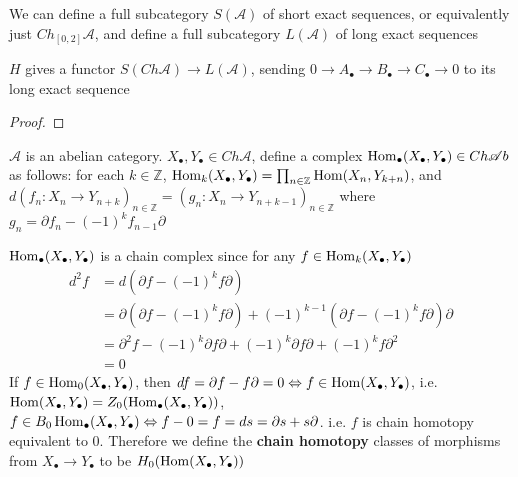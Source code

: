 \documentclass[../main.tex]{subfiles}
\begin{document}
\begin{definition}
We can define a full subcategory $S(\mathscr A)$ of short exact sequences, or equivalently just $Ch_{[0,2]}\mathscr A$, and define a full subcategory $L(\mathscr A)$ of long exact sequences
\end{definition}

\begin{lemma}
$H$ gives a functor $S(Ch\mathscr A)\to L(\mathscr A)$, sending $0\to A_\bullet\to B_\bullet\to C_\bullet\to0$ to its long exact sequence
\end{lemma}

\begin{proof}

\end{proof}

\begin{definition}
$\mathscr A$ is an abelian category. $X_\bullet,Y_\bullet\in Ch\mathscr A$, define a complex $\operatorname{Hom}_\bullet(X_\bullet,Y_\bullet)\in Ch\mathscr Ab$ as follows: for each $k\in\mathbb Z$, $\operatorname{Hom}_k(X_\bullet,Y_\bullet)=\prod_{n\in\mathbb Z}\operatorname{Hom}(X_n,Y_{k+n})$, and $d(f_n:X_n\to Y_{n+k})_{n\in\mathbb Z}=(g_n:X_n\to Y_{n+k-1})_{n\in\mathbb Z}$ where $g_n=\partial f_n-(-1)^kf_{n-1}\partial$
\begin{center}
\end{center}
$\operatorname{Hom}_\bullet(X_\bullet,Y_\bullet)$ is a chain complex since for any $f\in \operatorname{Hom}_k(X_\bullet,Y_\bullet)$
\begin{align*}
d^2f&=d(\partial f-(-1)^kf\partial) \\
&=\partial(\partial f-(-1)^kf\partial)+(-1)^{k-1}(\partial f-(-1)^kf\partial)\partial \\
&=\partial^2f-(-1)^k\partial f\partial+(-1)^k\partial f\partial+(-1)^kf\partial^2 \\
&=0
\end{align*}
If $f\in \operatorname{Hom}_0(X_\bullet,Y_\bullet)$, then $df=\partial f-f\partial=0\Leftrightarrow f\in \operatorname{Hom}(X_\bullet,Y_\bullet)$, i.e. $\operatorname{Hom}(X_\bullet,Y_\bullet)=Z_0(\operatorname{Hom}_\bullet(X_\bullet,Y_\bullet))$, $f\in B_0\operatorname{Hom}_\bullet(X_\bullet,Y_\bullet)\Leftrightarrow f-0=f=ds=\partial s+s\partial$. i.e. $f$ is chain homotopy equivalent to $0$. Therefore we define the \textbf{chain homotopy} classes of morphisms from $X_\bullet\to Y_\bullet$ to be $H_0(\operatorname{Hom}(X_\bullet,Y_\bullet))$
\end{definition}
\end{document}
